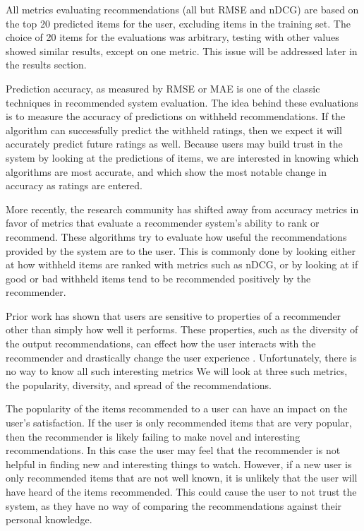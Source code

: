 \documentclass[letterpaper]{sig-alternate}
\begin{document}
  All metrics evaluating recommendations (all but RMSE and nDCG) are based on the top 20 predicted items for the user, excluding items in the training set.
  The choice of 20 items for the evaluations was arbitrary, testing with other values showed similar results, except on one metric.
  This issue will be addressed later in the results section.
  









  Prediction accuracy, as measured by RMSE or MAE is one of the classic techniques in recommended system evaluation.
  The idea behind these evaluations is to measure the accuracy of predictions on withheld recommendations.
  If the algorithm can successfully predict the withheld ratings, then we expect it will accurately predict future ratings as well.
  Because users may build trust in the system by looking at the predictions of items, we are interested in knowing which algorithms are most accurate, and which show the most notable change in accuracy as ratings are entered.
  
  More recently, the research community has shifted away from accuracy metrics in favor of metrics that evaluate a recommender system's ability to rank or recommend.
  These algorithms try to evaluate how useful the recommendations provided by the system are to the user.
  This is commonly done by looking either at how withheld items are ranked with metrics such as nDCG, or by looking at if good or bad withheld items tend to be recommended positively by the recommender.

  Prior work has shown that users are sensitive to properties of a recommender other than simply how well it performs.
  These properties, such as the diversity of the output recommendations, can effect how the user interacts with the recommender and drastically change the user experience \cite{zieglerDiversity, martijnDiversity}.
  Unfortunately, there is no way to know all such interesting metrics
  We will look at three such metrics, the popularity, diversity, and spread of the recommendations.

  The popularity of the items recommended to a user can have an impact on the user's satisfaction.
  If the user is only recommended items that are very popular, then the recommender is likely failing to make novel and interesting recommendations.
  In this case the user may feel that the recommender is not helpful in finding new and interesting things to watch.
  However, if a new user is only recommended items that are not well known, it is unlikely that the user will have heard of the items recommended.
  This could cause the user to not trust the system, as they have no way of comparing the recommendations against their personal knowledge.
\end{document}
